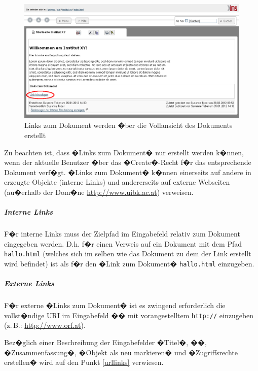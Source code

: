 \begin{figure}[!ht]
	\centering
		\includegraphics[width=\textwidth]{./images/create-linkzumdokument.png}
	\caption{Links zum Dokument werden �ber die Vollansicht des Dokuments erstellt}
	\label{fig:dokumentlinks}
\end{figure}

Zu beachten ist, dass �Links zum Dokument� nur erstellt werden k�nnen, wenn der
aktuelle Benutzer �ber das �Create�-Recht f�r das entsprechende Dokument verf�gt.
�Links zum Dokument� k�nnen einerseits auf andere in  erzeugte Objekte
(interne Links) und andererseits auf externe Webseiten (au�erhalb der Dom�ne
\url{http://www.uibk.ac.at}) verweisen.


\subparagraph{Interne Links}

F�r interne Links muss der Zielpfad im Eingabefeld  
relativ zum Dokument
eingegeben werden. D.h. f�r einen Verweis auf ein Dokument mit 
dem Pfad 
\nolinkurl{hallo.html} (welches sich im selben  wie das Dokument zu dem der Link
erstellt wird befindet) ist als 
f�r den �Link zum Dokument� \nolinkurl{hallo.html}
einzugeben.

\subparagraph{Externe Links}

F�r externe �Links zum Dokument� ist es zwingend erforderlich die vollst�ndige URI
im Eingabefeld �� mit vorangestelltem \nolinkurl{http://} einzugeben (z.\,B.:
\url{http://www.orf.at}).

Bez�glich einer Beschreibung der Eingabefelder �Titel�, ��, �Zusammenfassung�, �Objekt als neu markieren� und �Zugriffsrechte erstellen� wird auf den Punkt \ref{urllinks} verwiesen.

